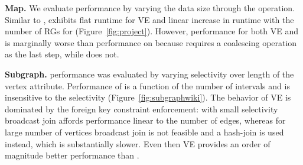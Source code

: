 {\bf Map.}  We evaluate  performance by varying the data
size through the  operation.  Similar to ,
 exhibits flat runtime for VE and linear increase in
runtime with the number of RGs for \sg (Figure~\ref{fig:project}).
However, performance for both VE and \sg is marginally worse than
performance on  because  requires a coalescing
operation as the last step, while  does not.

{\bf Subgraph.}   performance was evaluated by varying
selectivity over length of the vertex attribute.  Performance of \sg
is a function of the number of intervals and is insensitive to the
selectivity (Figure~\ref{fig:subgraphwiki}).  The behavior of VE is
dominated by the foreign key constraint enforcement: with small
selectivity broadcast join affords performance linear to the number of
edges, whereas for large number of vertices broadcast join is not
feasible and a hash-join is used instead, which is substantially
slower.  Even then VE provides an order of magnitude better
performance than \sg.

